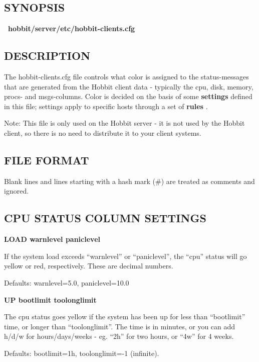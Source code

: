 \subsection{SYNOPSIS}
\textbf{~hobbit/server/etc/hobbit-clients.cfg}


 
\subsection{DESCRIPTION}
 The hobbit-clients.cfg file controls what color is assigned to the status-messages that are generated from the Hobbit client data - typically the cpu, disk, memory, procs- and msgs-columns. Color is decided on the basis of some \textbf{settings}
 defined in this file; settings apply to specific hosts through a set of \textbf{rules}
. 

  Note: This file is only used on the Hobbit server - it is not used by the Hobbit client, so there is no need to distribute it to your client systems. 


 
\subsection{FILE FORMAT}
 Blank lines and lines starting with a hash mark (\#) are treated as comments and ignored. 

 


 
\subsection{CPU STATUS COLUMN SETTINGS}


 \textbf{LOAD warnlevel paniclevel}



  If the system load exceeds ``warnlevel'' or ``paniclevel'', the ``cpu'' status will go yellow or red, respectively. These are decimal numbers. 


  Defaults: warnlevel=5.0, paniclevel=10.0 


 \textbf{UP bootlimit toolonglimit}



  The cpu status goes yellow if the system has been up for less than ``bootlimit'' time, or longer than ``toolonglimit''. The time is in minutes, or you can add h/d/w for hours/days/weeks - eg. ``2h'' for two hours, or ``4w'' for 4 weeks. 


  Defaults: bootlimit=1h, toolonglimit=-1 (infinite). 


